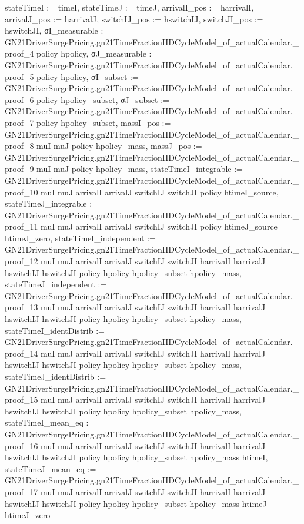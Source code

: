 \documentclass[10pt]{article}
\begin{document}
\begin{ReviewVerbatim}
  { stateTimeI := timeI, stateTimeJ := timeJ, arrivalI_pos := harrivalI, arrivalJ_pos := harrivalJ,
    switchIJ_pos := hswitchIJ, switchJI_pos := hswitchJI,
    σI_measurable := GN21DriverSurgePricing.gn21TimeFractionIIDCycleModel_of_actualCalendar._proof_4 policy hpolicy,
    σJ_measurable := GN21DriverSurgePricing.gn21TimeFractionIIDCycleModel_of_actualCalendar._proof_5 policy hpolicy,
    σI_subset := GN21DriverSurgePricing.gn21TimeFractionIIDCycleModel_of_actualCalendar._proof_6 policy hpolicy_subset,
    σJ_subset := GN21DriverSurgePricing.gn21TimeFractionIIDCycleModel_of_actualCalendar._proof_7 policy hpolicy_subset,
    massI_pos :=
      GN21DriverSurgePricing.gn21TimeFractionIIDCycleModel_of_actualCalendar._proof_8 muI muJ policy hpolicy_mass,
    massJ_pos :=
      GN21DriverSurgePricing.gn21TimeFractionIIDCycleModel_of_actualCalendar._proof_9 muI muJ policy hpolicy_mass,
    stateTimeI_integrable :=
      GN21DriverSurgePricing.gn21TimeFractionIIDCycleModel_of_actualCalendar._proof_10 muI muJ arrivalI arrivalJ
        switchIJ switchJI policy htimeI_source,
    stateTimeJ_integrable :=
      GN21DriverSurgePricing.gn21TimeFractionIIDCycleModel_of_actualCalendar._proof_11 muI muJ arrivalI arrivalJ
        switchIJ switchJI policy htimeJ_source htimeJ_zero,
    stateTimeI_independent :=
      GN21DriverSurgePricing.gn21TimeFractionIIDCycleModel_of_actualCalendar._proof_12 muI muJ arrivalI arrivalJ
        switchIJ switchJI harrivalI harrivalJ hswitchIJ hswitchJI policy hpolicy hpolicy_subset hpolicy_mass,
    stateTimeJ_independent :=
      GN21DriverSurgePricing.gn21TimeFractionIIDCycleModel_of_actualCalendar._proof_13 muI muJ arrivalI arrivalJ
        switchIJ switchJI harrivalI harrivalJ hswitchIJ hswitchJI policy hpolicy hpolicy_subset hpolicy_mass,
    stateTimeI_identDistrib :=
      GN21DriverSurgePricing.gn21TimeFractionIIDCycleModel_of_actualCalendar._proof_14 muI muJ arrivalI arrivalJ
        switchIJ switchJI harrivalI harrivalJ hswitchIJ hswitchJI policy hpolicy hpolicy_subset hpolicy_mass,
    stateTimeJ_identDistrib :=
      GN21DriverSurgePricing.gn21TimeFractionIIDCycleModel_of_actualCalendar._proof_15 muI muJ arrivalI arrivalJ
        switchIJ switchJI harrivalI harrivalJ hswitchIJ hswitchJI policy hpolicy hpolicy_subset hpolicy_mass,
    stateTimeI_mean_eq :=
      GN21DriverSurgePricing.gn21TimeFractionIIDCycleModel_of_actualCalendar._proof_16 muI muJ arrivalI arrivalJ
        switchIJ switchJI harrivalI harrivalJ hswitchIJ hswitchJI policy hpolicy hpolicy_subset hpolicy_mass htimeI,
    stateTimeJ_mean_eq :=
      GN21DriverSurgePricing.gn21TimeFractionIIDCycleModel_of_actualCalendar._proof_17 muI muJ arrivalI arrivalJ
        switchIJ switchJI harrivalI harrivalJ hswitchIJ hswitchJI policy hpolicy hpolicy_subset hpolicy_mass htimeJ
        htimeJ_zero }
\end{ReviewVerbatim}
\end{document}
